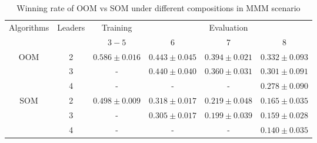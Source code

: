 \documentclass[10pt]{article} %
\begin{document}
\begin{table}[ht]
\caption{Winning rate of OOM vs SOM under different compositions in MMM scenario}
  \label{table-results-extended_mmm}
  \centering
\renewcommand{\arraystretch}{1.2} %
\begin{tabular}{cccccc}
\hline \multirow{2}{*}{ Algorithms } & \multirow{2}{*}{ Leaders } & Training & \multicolumn{3}{c}{ Evaluation } \\
\cline { 4 - 6 } & & $3-5$ & 6 & 7 & 8 \\
 \hline \multirow{3}{*}{OOM} & 2 & $\mathbf{0.586} \pm 0.016$ & $\mathbf{0.443} \pm 0.045$ & $\mathbf{0.394} \pm 0.021$ & $\mathbf{0.332} \pm 0.093$ \\
 \cline { 2 - 6 } & 3 & -  & $0.440 \pm 0.040$ & $0.360 \pm 0.031$ & $0.301 \pm 0.091$ \\
  \cline { 2 - 6 } & 4 & -  & - & - & $0.278 \pm 0.090$ \\
\hline
\multirow{3}{*}{SOM} & 2 & $0.498 \pm 0.009$ & $0.318 \pm 0.017$ & $0.219 \pm 0.048$ & $0.165 \pm 0.035$ \\
 \cline { 2 - 6 } & 3 & -  & $0.305 \pm 0.017$ & $0.199 \pm 0.039$ & $0.159 \pm 0.028$ \\
  \cline { 2 - 6 } & 4 & -  & - & - & $0.140 \pm 0.035$ \\
\end{tabular}
\end{table}


\newpage




\end{document}
